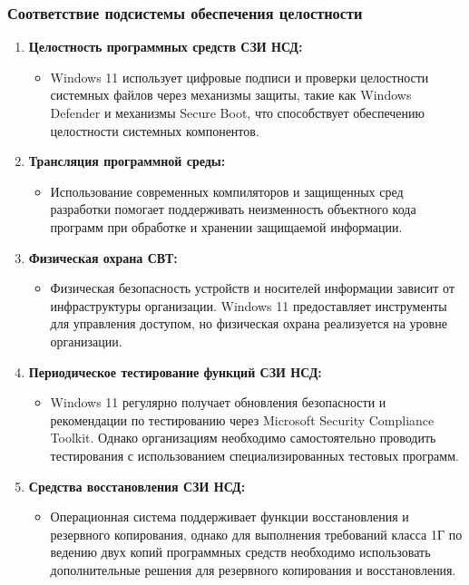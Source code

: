 \documentclass[a4paper, 14pt]{report}
\begin{document}
\subsubsection{Соответствие подсистемы обеспечения целостности}

\begin{enumerate}
    \item \textbf{Целостность программных средств СЗИ НСД:}
          \begin{itemize}
              \item Windows 11 использует цифровые подписи и проверки целостности системных файлов через механизмы защиты, такие как Windows Defender и механизмы Secure Boot, что способствует обеспечению целостности системных компонентов.
          \end{itemize}
    \item \textbf{Трансляция программной среды:}
          \begin{itemize}
              \item Использование современных компиляторов и защищенных сред разработки помогает поддерживать неизменность объектного кода программ при обработке и хранении защищаемой информации.
          \end{itemize}
    \item \textbf{Физическая охрана СВТ:}
          \begin{itemize}
              \item Физическая безопасность устройств и носителей информации зависит от инфраструктуры организации. Windows 11 предоставляет инструменты для управления доступом, но физическая охрана реализуется на уровне организации.
          \end{itemize}
    \item \textbf{Периодическое тестирование функций СЗИ НСД:}
          \begin{itemize}
              \item Windows 11 регулярно получает обновления безопасности и рекомендации по тестированию через Microsoft Security Compliance Toolkit. Однако организациям необходимо самостоятельно проводить тестирования с использованием специализированных тестовых программ.
          \end{itemize}
    \item \textbf{Средства восстановления СЗИ НСД:}
          \begin{itemize}
              \item Операционная система поддерживает функции восстановления и резервного копирования, однако для выполнения требований класса 1Г по ведению двух копий программных средств необходимо использовать дополнительные решения для резервного копирования и восстановления.

\end{itemize}
\end{enumerate}
\end{document}
